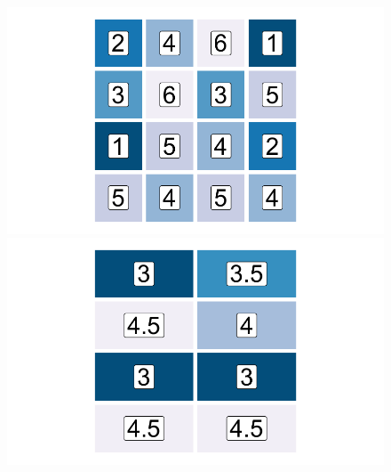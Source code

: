\begin{figure}[htb] %
    \centering %
    \begin{minipage}[b]{.32\linewidth} %
        \includegraphics[width=\linewidth,trim={0.5cm 0.5cm 0.5cm 0.5cm},clip]{body/figures/44-zon_a.pdf} %
    \end{minipage} %
    \hfill
    \begin{minipage}[b]{.32\linewidth}
       \includegraphics[width=\linewidth,trim={0.5cm 0.5cm 0.5cm 0.5cm},clip]{body/figures/45-zon_b.pdf}

\end{minipage}
\end{figure}
